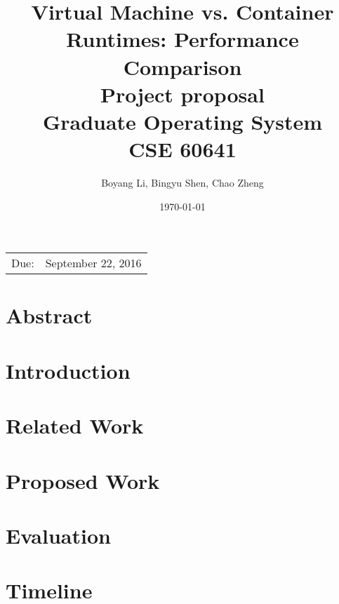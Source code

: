 \documentclass{article}
\title{{\textbf{Virtual Machine vs. Container Runtimes: Performance Comparison}} \\
       \vspace{3\baselineskip}
       {\large Project proposal} \\
       \vspace{3\baselineskip}
       {\large Graduate Operating System} \\ 
       {\large CSE 60641} %
      }
\date{\today} %
\author{Boyang Li, Bingyu Shen, Chao Zheng}
\begin{document}
\maketitle %

\begin{center}
\begin{tabular}{l r}
Due:& September 22, 2016\\ 
\end{tabular}
\end{center}
\nocite{*}

\pagebreak

\section{Abstract}

\section{Introduction}

\section{Related Work}

\section{Proposed Work}

\section{Evaluation}

\section{Timeline}






\end{document}
